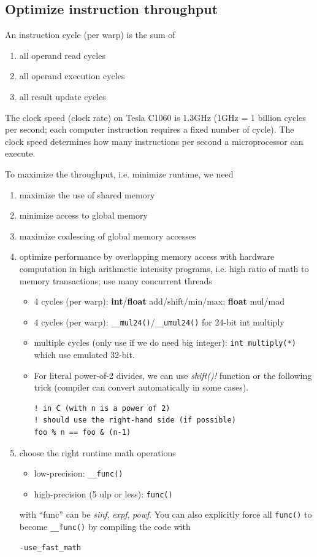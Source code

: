 \subsection{Optimize instruction throughput}
\label{sec:optim-instr-thro}

An instruction cycle (per warp) is the sum of 
\begin{enumerate}
\item all operand read cycles
\item all operand execution cycles
\item all result update cycles
\end{enumerate}
The clock speed (clock rate) on Tesla C1060 is 1.3GHz (1GHz = 1 billion cycles per
second; each computer instruction requires a fixed number of
cycle). The clock speed determines how many instructions per second a
microprocessor can execute. 

To maximize the throughput, i.e. minimize runtime, we need
\begin{enumerate}
\item maximize the use of shared memory
\item minimize access to global memory
\item maximize coalescing of global memory accesses
\item optimize performance by overlapping memory access with hardware
  computation in high arithmetic intensity programs, i.e. high ratio
  of math to memory transactions; use many concurrent threads
  \begin{itemize}
  \item 4 cycles (per warp): {\bf int}/{\bf float} add/shift/min/max;
    {\bf float} mul/mad
  \item 4 cycles (per warp): \verb!__mul24()!/\verb!__umul24()! for
    24-bit int multiply
  \item multiple cycles (only use if we do need big integer):
    \verb!int multiply(*)! which use emulated 32-bit.
  \item For literal power-of-2 divides, we can use {\it shift()!}
    function or the following trick (compiler can convert
    automatically in some cases).
\begin{lstlisting}
! in C (with n is a power of 2)
! should use the right-hand side (if possible)
foo % n == foo & (n-1)
\end{lstlisting}
  \end{itemize}
\item choose the right runtime math operations
  \begin{itemize}
  \item low-precision: \verb!__func()!  
  \item high-precision (5 ulp or less): \verb!func()!
  \end{itemize}
  with ``func'' can be {\it sinf}, {\it expf}, {\it powf}. You can also
  explicitly force all \verb!func()! to become \verb!__func()! by
  compiling the code with 
\begin{verbatim}
-use_fast_math
\end{verbatim}
\end{enumerate}

